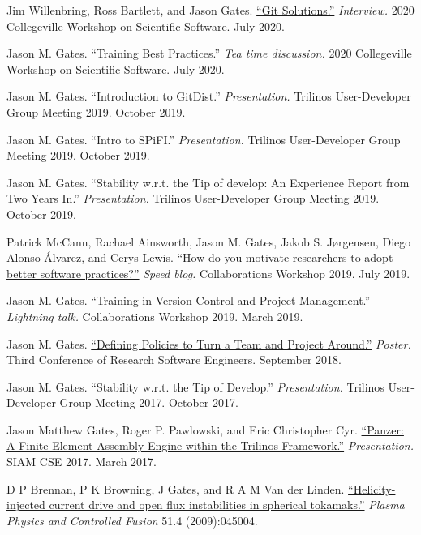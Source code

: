 \documentclass[margin,line,pifont,palatino,10pt]{res}
\begin{document}
\begin{resume}
\begin{list}{[] }{\leftmargin=0.255in}
\item
Jim Willenbring, Ross Bartlett, and Jason Gates.  \href{https://www.youtube.com/watch?v=OyJ0AnesaRw}{``Git Solutions.''}  \emph{Interview.}  2020 Collegeville Workshop on Scientific Software.  July 2020.
\item
Jason M. Gates.  ``Training Best Practices.''  \emph{Tea time discussion.}  2020 Collegeville Workshop on Scientific Software.  July 2020.
\item
Jason M. Gates.  ``Introduction to GitDist.''  \emph{Presentation.}  Trilinos User-Developer Group Meeting 2019.  October 2019.
\item
Jason M. Gates.  ``Intro to SPiFI.''  \emph{Presentation.}  Trilinos User-Developer Group Meeting 2019.  October 2019.
\item
Jason M. Gates.  ``Stability w.r.t. the Tip of develop:  An Experience Report from Two Years In.''  \emph{Presentation.}  Trilinos User-Developer Group Meeting 2019.  October 2019.
\item
Patrick McCann, Rachael Ainsworth, Jason M. Gates, Jakob S. Jørgensen, Diego Alonso-Álvarez, and Cerys Lewis.  \href{https://software.ac.uk/blog/2019-07-03-how-do-you-motivate-researchers-adopt-better-software-practices}{``How do you motivate researchers to adopt better software practices?''}  \emph{Speed blog.}  Collaborations Workshop 2019.  July 2019.
\item
Jason M. Gates.  \href{https://figshare.com/articles/presentation/Collaborations_Workshop_2019_-_Lightning_talk_-_Jason_Gates/8039777}{``Training in Version Control and Project Management.''}  \emph{Lightning talk.}  Collaborations Workshop 2019.  March 2019.
\item
Jason M. Gates.  \href{https://cfwebprod.sandia.gov/cfdocs/CompResearch/docs/DefiningPoliciesToTurnATeamAndProjectAround.pdf}{``Defining Policies to Turn a Team and Project Around.''}  \emph{Poster.}  Third Conference of Research Software Engineers.  September 2018.
\item
Jason M. Gates.  ``Stability w.r.t. the Tip of Develop.''  \emph{Presentation.}  Trilinos User-Developer Group Meeting 2017.  October 2017.
\item
Jason Matthew Gates, Roger P. Pawlowski, and Eric Christopher Cyr.  \href{https://cfwebprod.sandia.gov/cfdocs/CompResearch/docs/siamCseTalk.pdf}{``Panzer:  A Finite Element Assembly Engine within the Trilinos Framework.''}  {\em Presentation.}  SIAM CSE 2017.  March 2017.
\item
D P Brennan, P K Browning, J Gates, and R A M Van der Linden. \href{https://iopscience.iop.org/article/10.1088/0741-3335/51/4/045004/pdf}{``Helicity-injected current drive and open flux instabilities in spherical tokamaks.''}  {\em Plasma Physics and Controlled Fusion} 51.4 (2009):045004.
\end{list}







\end{resume}
\end{document}
